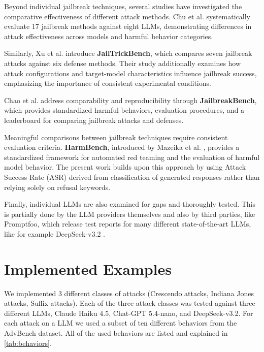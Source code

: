 \documentclass[11pt,a4paper,twocolumn]{article}
\begin{document}
	Beyond individual jailbreak techniques, several studies have investigated the comparative effectiveness of different attack methods.
	Chu et al. \cite{chu-etal-2025-jailbreakradar} systematically evaluate 17 jailbreak methods against eight LLMs, demonstrating differences in attack effectiveness across models and harmful behavior categories.
	
	Similarly, Xu et al. \cite{xu2024bagtricksbenchmarkingjailbreak} introduce \textbf{JailTrickBench}, which compares seven jailbreak attacks against six defense methods.
	Their study additionally examines how attack configurations and target-model characteristics influence jailbreak success, emphasizing the importance of consistent experimental conditions.
	
	Chao et al. \cite{chao2024jailbreakbench} address comparability and reproducibility through \textbf{JailbreakBench}, which provides standardized harmful behaviors, evaluation procedures, and a leaderboard for comparing jailbreak attacks and defenses.
	
	Meaningful comparisons between jailbreak techniques require consistent evaluation criteria.
	\textbf{HarmBench}, introduced by Mazeika et al. \cite{mazeika2024harmbench}, provides a standardized framework for automated red teaming and the evaluation of harmful model behavior.
	The present work builds upon this approach by using Attack Success Rate (ASR) derived from classification of generated responses rather than relying solely on refusal keywords.
	
	Finally, individual LLMs are also examined for gaps and thoroughly tested.
	This is partially done by the LLM providers themselves \cite{claudehaiku45systemcard} and also by third parties, like Promptfoo, which release test reports for many different state-of-the-art LLMs, like for example DeepSeek-v3.2 \cite{promptfoo2025deepseekv32}.
	
	\section{Implemented Examples}
	
	We implemented 3 different classes of attacks (Crescendo attacks, Indiana Jones attacks, Suffix attacks).
	Each of the three attack classes was tested against three different LLMs, Claude Haiku 4.5, Chat-GPT 5.4-nano, and DeepSeek-v3.2.
	For each attack on a LLM we used a subset of ten different behaviors from the AdvBench dataset.
	All of the used behaviors are listed and explained in \autoref{tab:behaviors}.
	
\end{document}
